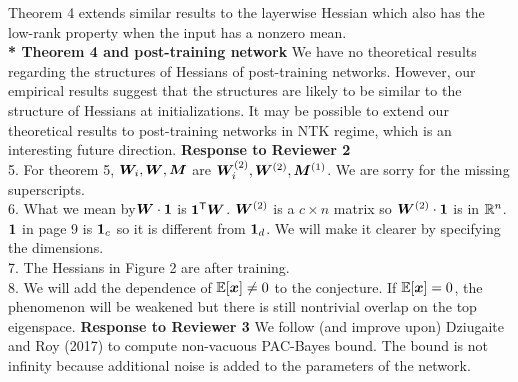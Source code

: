 \documentclass[12pt]{colt2022} %
\begin{document}
Theorem 4 extends similar results to the layerwise Hessian which also has the low-rank property when the input has a nonzero mean.\\%
\noindent\textbf{* Theorem 4 and post-training network\quad}
We have no theoretical results regarding the structures of Hessians of post-training networks. However, our empirical results suggest that the structures are likely to be similar to the structure of Hessians at initializations. It may be possible to extend our theoretical results to post-training networks in NTK regime, which is an interesting future direction.
\vskip 1mm
\noindent
\textbf{Response to Reviewer 2}\\
5. For theorem 5, ${\bm{W}}_i, {\bm{W}}, {\bm{M}}$ are ${\bm{W}}_i^{(2)}, {\bm{W}}^{(2)}, {\bm{M}}^{(1)}$. We are sorry for the missing superscripts.\\
6. What we mean by${\bm{W}} \cdot {\bm{1}}$ is ${\bm{1}}^{\mathsf{T}} {\bm{W}}$. ${\bm{W}}^{(2)}$ is a $c \times n$ matrix so ${\bm{W}}^{(2)} \cdot \mathbf{1}$ is in $\mathbb{R}^n$. $\mathbf{1}$ in page 9 is $\mathbf{1}_c$ so it is different from $\mathbf{1}_d$. We will make it clearer by specifying the dimensions.\\
7. The Hessians in Figure 2 are after training.\\
8. We will add the dependence of $\mathbb{E}[{\bm{x}}] \neq 0$ to the conjecture. If $\mathbb{E}[{\bm{x}}]=0$, the phenomenon will be weakened but there is still nontrivial overlap on the top eigenspace.
\vskip 1mm
\noindent
\textbf{Response to Reviewer 3}
\vskip 1mm
\noindent
We follow (and improve upon) Dziugaite and Roy (2017) to compute non-vacuous PAC-Bayes bound. The bound is not infinity because additional noise is added to the parameters of the network.%
\end{document}
